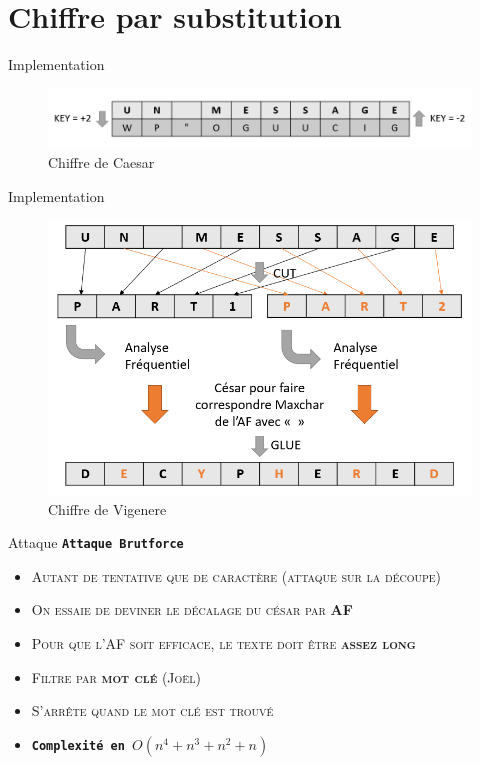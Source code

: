 \documentclass[10pt]{beamer}
\begin{document}
\section[Chiffre par substitution - \large{\texttt{\textit{César/Vigenere}}}]{Chiffre par substitution}

\begin{frame}{Implementation}
    \begin{figure}
        \includegraphics[scale=0.42]{caesar.PNG}
        \caption{Chiffre de Caesar}
  \end{figure}
 
\end{frame}
\begin{frame}{Implementation}
    \begin{figure}
        \includegraphics[scale=0.45]{vigenere.PNG}
        \caption{Chiffre de Vigenere}
  \end{figure}
  
\end{frame}

{
\begin{frame}{Attaque}
\alert{\texttt{\textbf{Attaque Brutforce}}}
	\begin{itemize}
    \item \textsc{Autant de tentative que de caractère (attaque sur la découpe)}
    \item \textsc{On essaie de deviner le décalage du césar par \textbf{AF}}
    \item \textsc{Pour que l'AF soit efficace, le texte doit être \textbf{assez long}}
    \item \textsc{Filtre par \textbf{mot clé} (Joël)}
    \item \textsc{S'arrête quand le mot clé est trouvé}
    \item \texttt{\textbf{Complexité en  $O(n^4 + n^3 + n^2 + n)$}}

  \end{itemize}
\end{frame}
}
\end{document}
